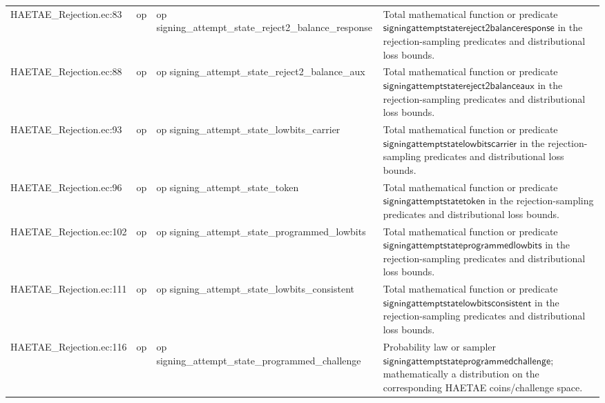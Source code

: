 \documentclass[10pt]{article}
\begin{document}
\begin{longtable}{L{0.11\textwidth}L{0.055\textwidth}L{0.385\textwidth}L{0.41\textwidth}}
HAETAE\_\allowbreak{}Rejection.\allowbreak{}ec:\allowbreak{}83 & op & {\ttfamily\scriptsize op signing\_\allowbreak{}attempt\_\allowbreak{}state\_\allowbreak{}reject2\_\allowbreak{}balance\_\allowbreak{}response} & Total mathematical function or predicate $\mathsf{signingattemptstatereject2balanceresponse}$ in the rejection-sampling predicates and distributional loss bounds. \\
HAETAE\_\allowbreak{}Rejection.\allowbreak{}ec:\allowbreak{}88 & op & {\ttfamily\scriptsize op signing\_\allowbreak{}attempt\_\allowbreak{}state\_\allowbreak{}reject2\_\allowbreak{}balance\_\allowbreak{}aux} & Total mathematical function or predicate $\mathsf{signingattemptstatereject2balanceaux}$ in the rejection-sampling predicates and distributional loss bounds. \\
HAETAE\_\allowbreak{}Rejection.\allowbreak{}ec:\allowbreak{}93 & op & {\ttfamily\scriptsize op signing\_\allowbreak{}attempt\_\allowbreak{}state\_\allowbreak{}lowbits\_\allowbreak{}carrier} & Total mathematical function or predicate $\mathsf{signingattemptstatelowbitscarrier}$ in the rejection-sampling predicates and distributional loss bounds. \\
HAETAE\_\allowbreak{}Rejection.\allowbreak{}ec:\allowbreak{}96 & op & {\ttfamily\scriptsize op signing\_\allowbreak{}attempt\_\allowbreak{}state\_\allowbreak{}token} & Total mathematical function or predicate $\mathsf{signingattemptstatetoken}$ in the rejection-sampling predicates and distributional loss bounds. \\
HAETAE\_\allowbreak{}Rejection.\allowbreak{}ec:\allowbreak{}102 & op & {\ttfamily\scriptsize op signing\_\allowbreak{}attempt\_\allowbreak{}state\_\allowbreak{}programmed\_\allowbreak{}lowbits} & Total mathematical function or predicate $\mathsf{signingattemptstateprogrammedlowbits}$ in the rejection-sampling predicates and distributional loss bounds. \\
HAETAE\_\allowbreak{}Rejection.\allowbreak{}ec:\allowbreak{}111 & op & {\ttfamily\scriptsize op signing\_\allowbreak{}attempt\_\allowbreak{}state\_\allowbreak{}lowbits\_\allowbreak{}consistent} & Total mathematical function or predicate $\mathsf{signingattemptstatelowbitsconsistent}$ in the rejection-sampling predicates and distributional loss bounds. \\
HAETAE\_\allowbreak{}Rejection.\allowbreak{}ec:\allowbreak{}116 & op & {\ttfamily\scriptsize op signing\_\allowbreak{}attempt\_\allowbreak{}state\_\allowbreak{}programmed\_\allowbreak{}challenge} & Probability law or sampler $\mathsf{signingattemptstateprogrammedchallenge}$; mathematically a distribution on the corresponding HAETAE coins/challenge space. \\

\end{longtable}
\end{document}

